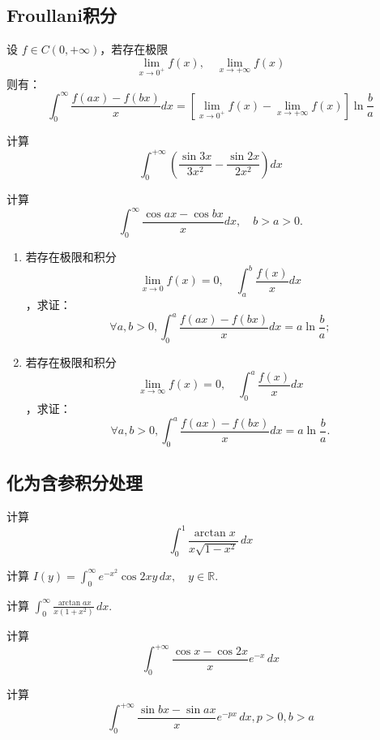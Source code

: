 \documentclass[lang=cn,10pt,thmcnt=section]{elegantbook}
\begin{document}
\subsection{Froullani积分}
\begin{example}[Froullani积分]
	设 \( f \in C(0,+\infty) \)，若存在极限  
	\[\lim_{x \to 0^+} f(x), \quad \lim_{x \to +\infty} f(x)\]  
	则有：  
	\[\int_0^\infty \frac{f(ax) - f(bx)}{x} dx = \left[ \lim_{x \to 0^+} f(x) - \lim_{x \to +\infty} f(x) \right] \ln \frac{b}{a}\]
\end{example}
	
\begin{example}
	计算  
	\[\int_0^{+\infty} \left( \frac{\sin 3x}{3x^2} - \frac{\sin 2x}{2x^2} \right) dx\]
\end{example}
	
\begin{example}
	计算 \[ \int_{0}^{\infty} \frac{\cos ax - \cos bx}{x} dx, \quad b > a > 0. \]
\end{example}
\begin{example}
	\begin{enumerate}
		\item 若存在极限和积分 \[ \lim_{x \to 0} f(x) = 0, \quad \int_{a}^{b} \frac{f(x)}{x} dx \]，求证：
		\[ \forall a, b > 0, \int_{0}^{a} \frac{f(ax) - f(bx)}{x} dx = a \ln \frac{b}{a};\]
		\item 若存在极限和积分 \[ \lim_{x \to \infty} f(x) = 0, \quad \int_{0}^{a} \frac{f(x)}{x} dx \]，求证：
		\[ \forall a, b > 0, \int_{0}^{a} \frac{f(ax) - f(bx)}{x} dx = a \ln \frac{b}{a}.\]
	\end{enumerate}
\end{example}
\subsection{化为含参积分处理}
\begin{example}
	计算 \[ \int_{0}^{1} \frac{\arctan x}{x\sqrt{1-x^2}} \, dx \]
	\end{example}
	
	\begin{example}
	计算 \( I(y) = \int_{0}^{\infty} e^{-x^2} \cos 2xy \, dx, \quad y \in \mathbb{R} \).
	\end{example}
	
	\begin{example}
	计算 \( \int_{0}^{\infty} \frac{\arctan ax}{x(1+x^2)} \, dx \).
	\end{example}
\begin{example}
	计算
	\[\int_{0}^{+\infty}\frac{\cos x-\cos 2x}{x}e^{-x}  \,dx 
	\]
\end{example}
\begin{example}
	计算
	\[\int_{0}^{+\infty}\frac{\sin bx-\sin ax}{x}e^{-px}  \,dx ,p>0,b>a
	\]
\end{example}
\end{document}

